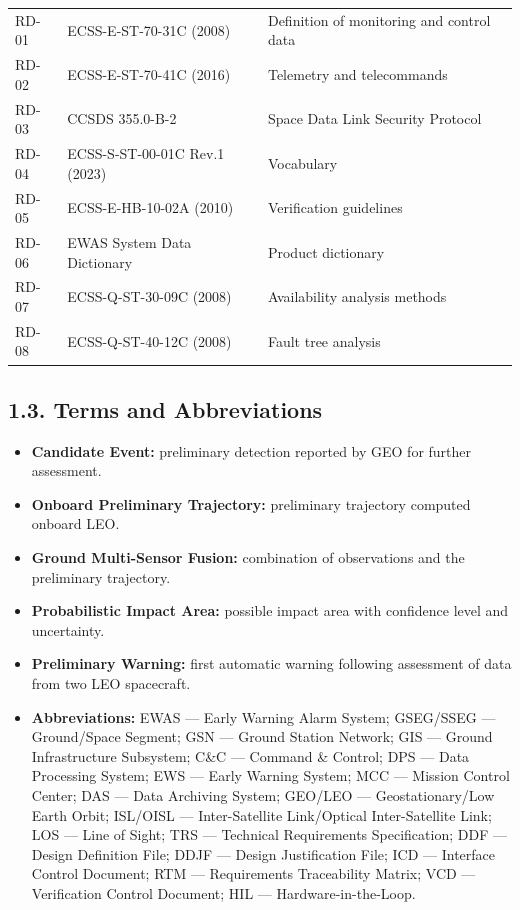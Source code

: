 \begingroup{}
\begin{longtable}{|P{0.12}|P{0.45}|P{0.43}|}
\hline{}
 &  & \\ \hline
\endhead
\hline\endlastfoot
RD-01 & ECSS-E-ST-70-31C (2008) & Definition of monitoring and control data\\ \hline
RD-02 & ECSS-E-ST-70-41C (2016) & Telemetry and telecommands\\ \hline
RD-03 & CCSDS 355.0-B-2 & Space Data Link Security Protocol\\ \hline
RD-04 & ECSS-S-ST-00-01C Rev.1 (2023) & Vocabulary\\ \hline
RD-05 & ECSS-E-HB-10-02A (2010) & Verification guidelines\\ \hline
RD-06 & EWAS System Data Dictionary & Product dictionary\\ \hline
RD-07 & ECSS-Q-ST-30-09C (2008) & Availability analysis methods\\ \hline
RD-08 & ECSS-Q-ST-40-12C (2008) & Fault tree analysis\\*
\end{longtable}
\endgroup

\subsection{1.3. Terms and Abbreviations}\label{terms-and-abbreviations}

\begin{itemize}
\item \textbf{Candidate Event:} preliminary detection reported by GEO for further assessment.
\item \textbf{Onboard Preliminary Trajectory:} preliminary trajectory computed onboard LEO.
\item \textbf{Ground Multi-Sensor Fusion:} combination of observations and the preliminary trajectory.
\item \textbf{Probabilistic Impact Area:} possible impact area with confidence level and uncertainty.
\item \textbf{Preliminary Warning:} first automatic warning following assessment of data from two LEO spacecraft.
\item \textbf{Abbreviations:} EWAS — Early Warning Alarm System; GSEG/\allowbreak{}SSEG — Ground/\allowbreak{}Space Segment; GSN — Ground Station Network; GIS — Ground Infrastructure Subsystem; C\&C — Command \& Control; DPS — Data Processing System; EWS — Early Warning System; MCC — Mission Control Center; DAS — Data Archiving System; GEO/\allowbreak{}LEO — Geostationary/\allowbreak{}Low Earth Orbit; ISL/\allowbreak{}OISL — Inter-Satellite Link/\allowbreak{}Optical Inter-Satellite Link; LOS — Line of Sight; TRS — Technical Requirements Specification; DDF — Design Definition File; DDJF — Design Justification File; ICD — Interface Control Document; RTM — Requirements Traceability Matrix; VCD — Verification Control Document; HIL — Hardware-in-the-Loop.
\end{itemize}
